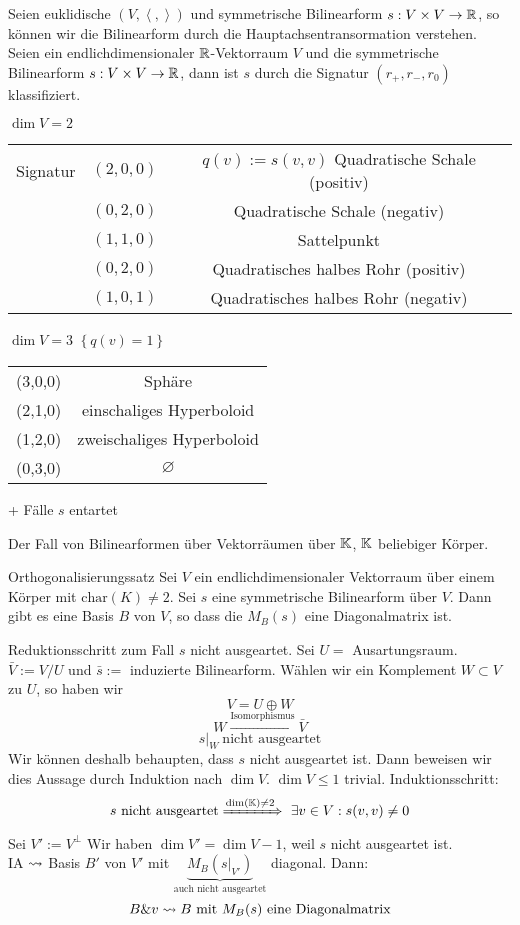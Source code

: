 Seien euklidische $(V,\left\langle , \right\rangle )$ und symmetrische Bilinearform $s:V\times V\to\mathbb{R}$, so können wir die Bilinearform durch die Hauptachsentransormation verstehen.
Seien ein endlichdimensionaler $\mathbb{R}$-Vektorraum $V$ und die symmetrische Bilinearform $s:V\times V\to\mathbb{R}$, dann ist $s$ durch die Signatur $(r_+,r_-,r_0)$ klassifiziert.
\begin{Eig}
  $\dim V=2$
  \begin{tabular}[htbp]{rcc}
    Signatur & $(2,0,0)$ & $q(v):=s(v,v)$ Quadratische Schale (positiv)\\
    & $(0,2,0)$ & Quadratische Schale (negativ)\\
    & $(1,1,0)$ & Sattelpunkt\\
    & $(0,2,0)$ & Quadratisches halbes Rohr (positiv)\\
    & $(1,0,1)$ & Quadratisches halbes Rohr (negativ)
  \end{tabular}
\end{Eig}
\begin{Eig}
  $\dim V=3$ $\left\{ q(v)=1 \right\}$
  \begin{tabular}[htbp]{cc}
    (3,0,0) & Sphäre \\
    (2,1,0) & einschaliges Hyperboloid \\
    (1,2,0) & zweischaliges Hyperboloid \\
    (0,3,0) & $\varnothing$
  \end{tabular}
  + Fälle $s$ entartet
\end{Eig}
Der Fall von Bilinearformen über Vektorräumen über $\mathbb{K}$, $\mathbb{K}$ beliebiger Körper.
\begin{Prop}{Orthogonalisierungssatz}
  Sei $V$ ein endlichdimensionaler Vektorraum über einem Körper mit $\text{char} (K)\neq 2$. Sei $s$ eine symmetrische Bilinearform über $V$. Dann gibt es eine Basis $B$ von $V$, so dass die $M_B(s)$ eine Diagonalmatrix ist.
\end{Prop}
\begin{Bew}
  Reduktionsschritt zum Fall $s$ nicht ausgeartet. Sei $U=$ Ausartungsraum. $\bar V:=V/U$ und $\bar s:=$ induzierte Bilinearform. Wählen wir ein Komplement $W\subset V$ zu $U$, so haben wir
  \[V=U\oplus W\]
  \[W\xrightarrow{\text{Isomorphismus}}\bar V\]
  \[s|_W \ \text{nicht ausgeartet}\]
  Wir können deshalb behaupten, dass $s$ nicht ausgeartet ist. Dann beweisen wir dies Aussage durch Induktion nach $\dim V$. $\dim V\leq 1$ trivial. Induktionsschritt:
  \[s\ \text{nicht ausgeartet} \xRightarrow{\dim (\mathbb{K})\neq 2}\ \exists v\in V: s(v,v)\neq 0\]
  Sei $V':=V^\perp$ Wir haben $\dim V'=\dim V-1$, weil $s$ nicht ausgeartet ist.\\
  IA $\rightsquigarrow$ Basis $B'$ von $V'$ mit $\underbrace{M_B(s|_{V'})}_{\text{auch nicht ausgeartet}}$ diagonal.
  Dann:
  \[B\& v \rightsquigarrow B \text{ mit } M_B(s) \text{ eine Diagonalmatrix}\]
\end{Bew}
